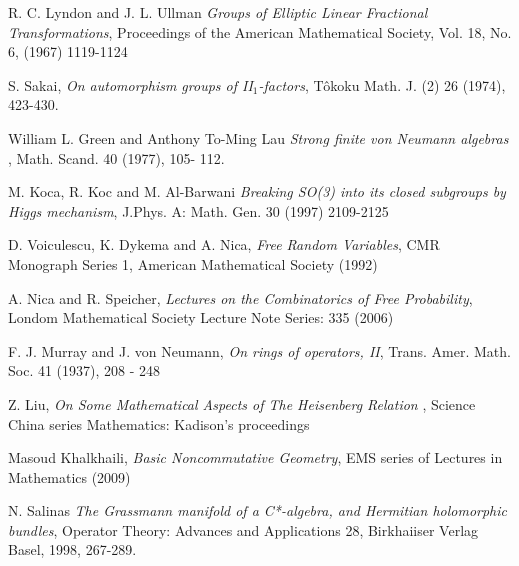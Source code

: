 \documentclass[a4paper,10pt]{amsart}
\begin{document}
\begin{thebibliography}{9}
 R. C. Lyndon and J. L. Ullman {\em Groups of Elliptic Linear Fractional Transformations}, Proceedings of the American Mathematical Society,   Vol. 18, No. 6, (1967) 1119-1124

 S. Sakai, {\em On automorphism groups of II$_1$-factors}, T\^{o}koku Math. J. (2) 26 (1974), 423-430.

 William L. Green and Anthony To-Ming Lau {\em Strong finite von Neumann algebras }, Math. Scand. 40 (1977), 105- 112.

 M. Koca, R. Koc and M. Al-Barwani {\em Breaking SO(3) into its closed subgroups by Higgs mechanism}, J.Phys. A: Math. Gen. 30 (1997) 2109-2125

 D. Voiculescu, K. Dykema and A. Nica, {\em Free Random Variables}, CMR Monograph Series 1, American Mathematical Society (1992)

 A. Nica and R. Speicher, {\em Lectures on the Combinatorics of Free Probability}, Londom Mathematical Society Lecture Note Series: 335 (2006)

 F. J. Murray and J. von Neumann, {\em On rings of operators, II}, Trans. Amer. Math. Soc. 41 (1937), 208 - 248

 Z. Liu, {\em On Some Mathematical Aspects of The Heisenberg Relation }, Science China series Mathematics: Kadison's proceedings

 Masoud Khalkhaili, {\em Basic Noncommutative Geometry}, EMS series of Lectures in Mathematics (2009)

    N. Salinas
    {\em The Grassmann manifold of a C*-algebra, and Hermitian 
    holomorphic bundles}, 
    Operator Theory: Advances and Applications 28, 
    Birkhaiiser Verlag Basel, 1998, 267-289.
\end{thebibliography}
\end{document}
